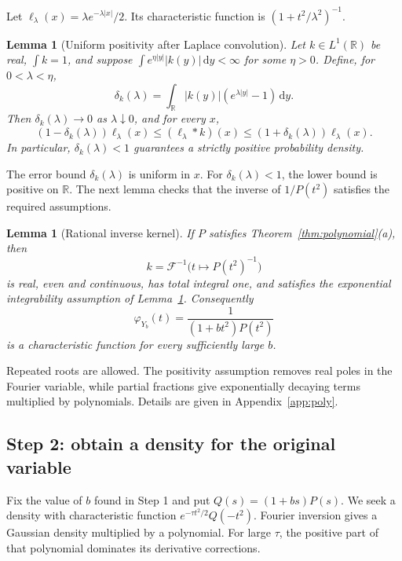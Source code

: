 \documentclass[11pt,twoside]{article}
\theoremstyle{journalplain}
\numberwithin{equation}{section}
\newtheorem{lemma}[theorem]{Lemma}
\theoremstyle{journaldefinition}
\newcommand{\R}{\mathbb R}
\newcommand{\dd}{\,\mathrm d}
\begin{document}
Let $\ell_\lambda(x)=\lambda e^{-\lambda|x|}/2$. Its characteristic function is $(1+t^2/\lambda^2)^{-1}$.
\begin{lemma}[Uniform positivity after Laplace convolution]\label{lem:laplace}
Let $k\in L^1(\R)$ be real, $\int k=1$, and suppose $\int e^{\eta|y|}|k(y)|\dd y<\infty$ for some $\eta>0$. Define, for $0<\lambda<\eta$,
\begin{equation}\label{eq:delta}
 \delta_k(\lambda)=\int_\R |k(y)|(e^{\lambda|y|}-1)\dd y.
\end{equation}
Then $\delta_k(\lambda)\to0$ as $\lambda\downarrow0$, and for every $x$,
\begin{equation}\label{eq:laplace-bounds}
 (1-\delta_k(\lambda))\ell_\lambda(x)
 \le (\ell_\lambda*k)(x)
 \le(1+\delta_k(\lambda))\ell_\lambda(x).
\end{equation}
In particular, $\delta_k(\lambda)<1$ guarantees a strictly positive probability density.
\end{lemma}
The error bound $\delta_k(\lambda)$ is uniform in $x$. For $\delta_k(\lambda)<1$, the lower bound is positive on $\R$. The next lemma checks that the inverse of $1/P(t^2)$ satisfies the required assumptions.

\begin{lemma}[Rational inverse kernel]\label{lem:rational}
If $P$ satisfies Theorem~\ref{thm:polynomial}(a), then
\[
 k=\mathcal F^{-1}\bigl(t\mapsto P(t^2)^{-1}\bigr)
\]
is real, even and continuous, has total integral one, and satisfies the exponential integrability assumption of Lemma~\ref{lem:laplace}. Consequently
\begin{equation}\label{eq:Y}
 \varphi_{Y_b}(t)=\frac1{(1+bt^2)P(t^2)}
\end{equation}
is a characteristic function for every sufficiently large $b$.
\end{lemma}
Repeated roots are allowed. The positivity assumption removes real poles in the Fourier variable, while partial fractions give exponentially decaying terms multiplied by polynomials. Details are given in Appendix~\ref{app:poly}.

\subsection{Step 2: obtain a density for the original variable}
Fix the value of $b$ found in Step 1 and put $Q(s)=(1+bs)P(s)$. We seek a density with characteristic function $e^{-\tau t^2/2}Q(-t^2)$. Fourier inversion gives a Gaussian density multiplied by a polynomial. For large $\tau$, the positive part of that polynomial dominates its derivative corrections.
\end{document}
